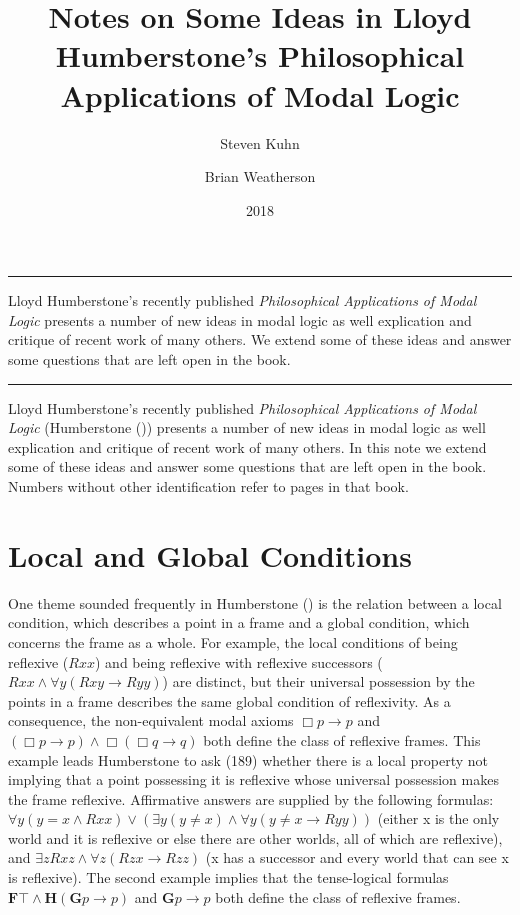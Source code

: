 \documentclass[
  10pt,
  letterpaper,
  DIV=11,
  numbers=noendperiod,
  twoside]{scrartcl}
\title{Notes on Some Ideas in Lloyd Humberstone's Philosophical
Applications of Modal Logic}
\author{Steven Kuhn \and Brian Weatherson}
\date{2018}
\renewenvironment{abstract}
 {\vspace{-1.25cm}
 \quotation\small\noindent\rule{\linewidth}{.5pt}\par\smallskip
 \noindent }
 {\par\noindent\rule{\linewidth}{.5pt}\endquotation}
\begin{document}
\maketitle
\begin{abstract}
Lloyd Humberstone's recently published \emph{Philosophical Applications
of Modal Logic} presents a number of new ideas in modal logic as well
explication and critique of recent work of many others. We extend some
of these ideas and answer some questions that are left open in the book.
\end{abstract}

Lloyd Humberstone's recently published \emph{Philosophical Applications
of Modal Logic} (Humberstone ())
presents a number of new ideas in modal logic as well explication and
critique of recent work of many others. In this note we extend some of
these ideas and answer some questions that are left open in the book.
Numbers without other identification refer to pages in that book.

\section{Local and Global Conditions}\label{local-and-global-conditions}

One theme sounded frequently in Humberstone
() is the relation between a local
condition, which describes a point in a frame and a global condition,
which concerns the frame as a whole. For example, the local conditions
of being reflexive (\(Rxx\)) and being reflexive with reflexive
successors (\(Rxx \land \forall y(Rxy \rightarrow Ryy)\)) are distinct,
but their universal possession by the points in a frame describes the
same global condition of reflexivity. As a consequence, the
non-equivalent modal axioms \(\Box p\rightarrow p\) and
\((\Box p\rightarrow p) \land \Box(\Box q\rightarrow q)\) both define
the class of reflexive frames. This example leads Humberstone to ask
(189) whether there is a local property not implying that a point
possessing it is reflexive whose universal possession makes the frame
reflexive. Affirmative answers are supplied by the following formulas:
\(\forall y(y{=}x\wedge Rxx) \vee (\exists y(y\ne x) \wedge \forall y(y\ne x \rightarrow Ryy))\)
(either x is the only world and it is reflexive or else there are other
worlds, all of which are reflexive), and
\(\exists zRxz \wedge \forall z(Rzx \rightarrow Rzz)\) (x has a
successor and every world that can see x is reflexive). The second
example implies that the tense-logical formulas
\({\mathbf{F}}\top \wedge \mathbf{H}(\mathbf{G}p\rightarrow p)\) and
\(\mathbf{G}p\rightarrow p\) both define the class of reflexive frames.
\end{document}
